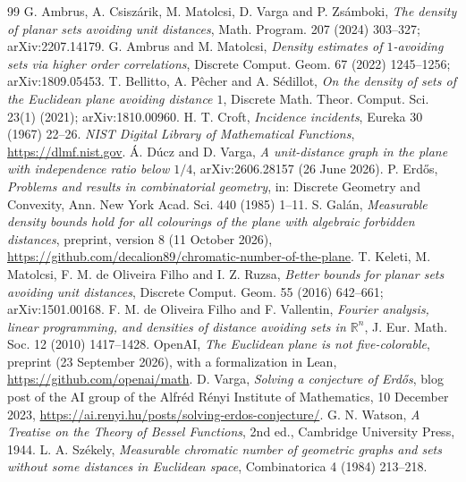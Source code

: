 \documentclass[11pt,a4paper]{amsart}
\theoremstyle{remark}
\newcommand{\R}{\mathbb{R}}
\begin{document}
\begin{thebibliography}{99}
 G. Ambrus, A. Csisz\'arik, M. Matolcsi, D. Varga and P. Zs\'amboki, \emph{The density of planar sets
avoiding unit distances}, Math. Program. 207 (2024) 303--327; arXiv:2207.14179.
 G. Ambrus and M. Matolcsi, \emph{Density estimates of $1$-avoiding sets via higher order correlations},
Discrete Comput. Geom. 67 (2022) 1245--1256; arXiv:1809.05453.
 T. Bellitto, A. P\^echer and A. S\'edillot, \emph{On the density of sets of the Euclidean plane avoiding
distance $1$}, Discrete Math. Theor. Comput. Sci. 23(1) (2021); arXiv:1810.00960.
 H. T. Croft, \emph{Incidence incidents}, Eureka 30 (1967) 22--26.
 \emph{NIST Digital Library of Mathematical Functions}, \url{https://dlmf.nist.gov}.
 \'A. D\'ucz and D. Varga, \emph{A unit-distance graph in the plane with independence ratio below $1/4$},
arXiv:2606.28157 (26 June 2026).
 P. Erd\H{o}s, \emph{Problems and results in combinatorial geometry}, in: Discrete Geometry and
Convexity, Ann. New York Acad. Sci. 440 (1985) 1--11.
 S. Gal\'an, \emph{Measurable density bounds hold for all colourings of the plane with algebraic
forbidden distances}, preprint, version 8 (11 October 2026),
\url{https://github.com/decalion89/chromatic-number-of-the-plane}.
 T. Keleti, M. Matolcsi, F. M. de Oliveira Filho and I. Z. Ruzsa, \emph{Better bounds for planar sets
avoiding unit distances}, Discrete Comput. Geom. 55 (2016) 642--661; arXiv:1501.00168.
 F. M. de Oliveira Filho and F. Vallentin, \emph{Fourier analysis, linear programming, and densities of
distance avoiding sets in $\R^n$}, J. Eur. Math. Soc. 12 (2010) 1417--1428.
 OpenAI, \emph{The Euclidean plane is not five-colorable}, preprint (23 September 2026), with a
formalization in Lean, \url{https://github.com/openai/math}.
 D. Varga, \emph{Solving a conjecture of Erd\H{o}s}, blog post of the AI group of the Alfr\'ed R\'enyi
Institute of Mathematics, 10 December 2023, \url{https://ai.renyi.hu/posts/solving-erdos-conjecture/}.
 G. N. Watson, \emph{A Treatise on the Theory of Bessel Functions}, 2nd ed., Cambridge University
Press, 1944.
 L. A. Sz\'ekely, \emph{Measurable chromatic number of geometric graphs and sets without some distances
in Euclidean space}, Combinatorica 4 (1984) 213--218.
\end{thebibliography}
\end{document}
